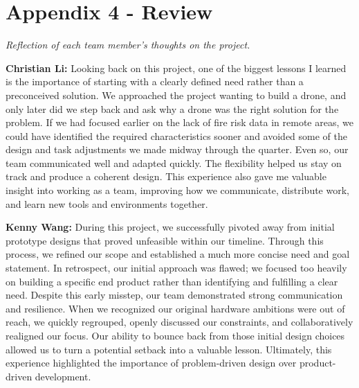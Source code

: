 \documentclass[journal, onecolumn]{IEEEtran}
\begin{document}
\newpage

\section{Appendix 4 - Review}


\textit{Reflection of each team member's thoughts on the project.}

\vspace{1em}

\textbf{Christian Li:} Looking back on this project, one of the biggest lessons I learned is the importance of starting with a clearly defined need rather than a preconceived solution. We approached the project wanting to build a drone, and only later did we step back and ask why a drone was the right solution for the problem. If we had focused earlier on the lack of fire risk data in remote areas, we could have identified the required characteristics sooner and avoided some of the design and task adjustments we made midway through the quarter. Even so, our team communicated well and adapted quickly. The flexibility helped us stay on track and produce a coherent design. This experience also gave me valuable insight into working as a team, improving how we communicate, distribute work, and learn new tools and environments together.

\vspace{1em}

\textbf{Kenny Wang:} During this project, we successfully pivoted away from initial prototype designs that proved unfeasible within our timeline. Through this process, we refined our scope and established a much more concise need and goal statement. In retrospect, our initial approach was flawed; we focused too heavily on building a specific end product rather than identifying and fulfilling a clear need. Despite this early misstep, our team demonstrated strong communication and resilience. When we recognized our original hardware ambitions were out of reach, we quickly regrouped, openly discussed our constraints, and collaboratively realigned our focus. Our ability to bounce back from those initial design choices allowed us to turn a potential setback into a valuable lesson. Ultimately, this experience highlighted the importance of problem-driven design over product-driven development.

\vspace{1em}
\end{document}
